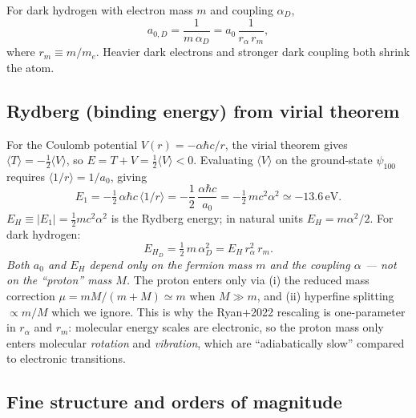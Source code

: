\documentclass[12pt]{article}
\newcommand{\eV}{\,\mathrm{eV}}
\begin{document}
For dark hydrogen with electron mass $m$ and coupling $\alpha_D$,
%
\begin{equation}
  a_{0,D} = \frac{1}{m\,\alpha_D}
          = a_0\,\frac{1}{r_\alpha\,r_m},
\end{equation}
%
where $r_m \equiv m/m_e$.  Heavier dark electrons and stronger dark
coupling both shrink the atom.

\subsection{Rydberg (binding energy) from virial theorem}
\label{app:rydberg}

For the Coulomb potential $V(r) = -\alpha\hbar c/r$, the virial
theorem gives $\langle T\rangle = -\tfrac{1}{2}\langle V\rangle$, so
$E = T + V = \tfrac{1}{2}\langle V\rangle < 0$.  Evaluating $\langle
V\rangle$ on the ground-state $\psi_{100}$ requires
$\langle 1/r\rangle = 1/a_0$, giving
%
\begin{equation}
  E_1 = -\tfrac{1}{2}\,\alpha\hbar c\,\langle 1/r\rangle
      = -\frac{1}{2}\,\frac{\alpha\hbar c}{a_0}
      = -\tfrac{1}{2}\,m c^2 \alpha^2
      \simeq -13.6\eV.
  \label{eq:rydberg}
\end{equation}
%
$E_H \equiv |E_1| = \tfrac{1}{2}m c^2\alpha^2$ is the Rydberg energy;
in natural units $E_H = m\alpha^2/2$.  For dark hydrogen:
%
\begin{equation}
  E_{H_D} = \tfrac{1}{2}\,m\,\alpha_D^2
    = E_H\,r_\alpha^2\,r_m.
\end{equation}
%
\emph{Both $a_0$ and $E_H$ depend only on the fermion mass $m$ and
the coupling $\alpha$ --- not on the ``proton'' mass $M$.}  The
proton enters only via (i) the reduced mass correction
$\mu = mM/(m+M)\simeq m$ when $M\gg m$, and (ii) hyperfine splitting
$\propto m/M$ which we ignore.  This is why the Ryan+2022 rescaling
is one-parameter in $r_\alpha$ and $r_m$: molecular energy scales are
electronic, so the proton mass only enters molecular \emph{rotation}
and \emph{vibration}, which are ``adiabatically slow'' compared to
electronic transitions.

\subsection{Fine structure and orders of magnitude}
\label{app:orders}
\end{document}
